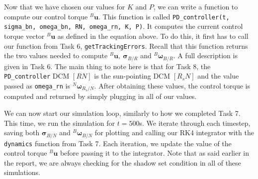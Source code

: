 \documentclass[conf]{new-aiaa}
\begin{document}
Now that we have chosen our values for $K$ and $P$, we can write a function to compute our control torque ${}^B\bm u$. This function is called \texttt{PD\_controller(t, sigma\_bn, omega\_bn, RN, omega\_rn, K, P)}. It computes the current control torque vector ${}^B\bm u$ as defined in the equation above. To do this, it first has to call our function from Task 6, \texttt{getTrackingErrors}. Recall that this function returns the two values needed to compute ${}^B\bm u,\ \bm\sigma_{B/R}$ and ${}^B\bm\omega_{B/R}$. A full description is given in Task 6. The main thing to note here is that for Task 8, the \texttt{PD\_controller} DCM $[RN]$ is the sun-pointing DCM $[R_sN]$ and the value passed as \texttt{omega\_rn} is ${}^N\bm\omega_{R_s/N}$. After obtaining these values, the control torque is computed and returned by simply plugging in all of our values. 

We can now start our simulation loop, similarly to how we completed Task 7. This time, we run the simulation for $t=500$s. We iterate through each timestep, saving both $\bm\sigma_{B/N}$ and ${}^B\bm\omega_{B/N}$ for plotting and calling our RK4 integrator with the \texttt{dynamics} function from Task 7. Each iteration, we update the value of the control torque ${}^B\bm u$ before passing it to the integrator. Note that as said earlier in the report, we are always checking for the shadow set condition in all of these simulations. 
\end{document}
